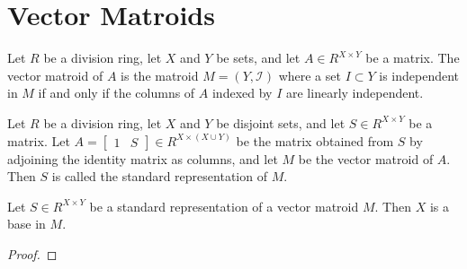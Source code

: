\section{Vector Matroids}

\begin{definition}
    \label{Matroid}
    \leanok
\end{definition}

\begin{definition}
    \label{VectorMatroid}
    \leanok
    Let $R$ be a division ring, let $X$ and $Y$ be sets, and let $A \in R^{X \times Y}$ be a matrix. The vector matroid of $A$ is the matroid $M = (Y, \mathcal{I})$ where a set $I \subset Y$ is independent in $M$ if and only if the columns of $A$ indexed by $I$ are linearly independent.
\end{definition}

\begin{definition}
    \label{StandardRepr}
    \leanok
    Let $R$ be a division ring, let $X$ and $Y$ be disjoint sets, and let $S \in R^{X \times Y}$ be a matrix. Let $A = \begin{bmatrix} 1 & S \end{bmatrix} \in R^{X \times (X \cup Y)}$ be the matrix obtained from $S$ by adjoining the identity matrix as columns, and let $M$ be the vector matroid of $A$. Then $S$ is called the standard representation of $M$.
\end{definition}

\begin{lemma}
    \label{StandardRepr.toMatroid_isBase_X}
    \leanok
    Let $S \in R^{X \times Y}$ be a standard representation of a vector matroid $M$. Then $X$ is a base in $M$.
\end{lemma}

\begin{proof}
    \leanok
    \SeeLean
\end{proof}



